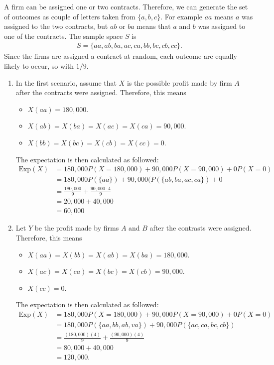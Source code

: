 \begin{problem}
A firm can be assigned one or two contracts. Therefore, we can generate the set of outcomes as couple of letters taken from $\{ a, b, c \}$. For example $aa$ means $a$ was assigned to the two contracts, but $ab$ or $ba$ means that $a$ and $b$ was assigned to one of the contracts. The sample space $S$ is
    \begin{align*}
    S = \{ aa, ab, ba, ac, ca, bb, bc, cb, cc \} .
    \end{align*}
Since the firms are assigned a contract at random, each outcome are equally likely to occur, so with $1/9$. 

\begin{enumerate}[label=\alph*)]
    \item In the first scenario, assume that $X$ is the possible profit made by firm $A$ after the contracts were assigned. Therefore, this means
        \begin{itemize}
            \item $X (aa) = 180,000$.
            \item $X(ab) = X (ba) = X(ac) = X (ca) = 90,000$.
            \item $X(bb) = X(bc) = X(cb) = X (cc) = 0$.
        \end{itemize}
    The expectation is then calculated as followed:
    \begin{align*}
        \mathrm{Exp} (X) &= 180,000 P (X = 180,000) + 90,000 P (X = 90,000) + 0 P (X = 0) \\ 
        &= 180,000 P (\{ aa \}) + 90,000 (P (\{ ab , ba, ac, ca \}) + 0 \\ 
        &= \frac{180,000}{9} + \frac{90,000 \cdot 4}{9} \\ 
        &=  20,000 + 40,000 \\
        &= 60,000
    \end{align*}
    \item Let $Y$ be the profit made by firms $A$ and $B$ after the contrasts were assigned. Therefore, this means
        \begin{itemize}
            \item $X (aa) = X(bb) = X(ab) = X (ba) = 180,000$.
            \item $X (ac) = X(ca) = X(bc) = X(cb) = 90,000$.
            \item $X (cc) = 0$.
        \end{itemize}
    The expectation is then calculated as followed:
        \begin{align*}
        \mathrm{Exp} (X) &= 180,000 P (X = 180,000) + 90,000 P (X = 90,000) + 0 P (X = 0) \\ 
        &= 180,000 P (\{ aa, bb, ab, va \}) + 90,000 P (\{ ac, ca, bc, cb \}) \\ 
        &= \frac{(180,000)(4)}{9} + \frac{(90,000)(4)}{9} \\ 
        &= 80,000 + 40,000 \\ 
        &= 120,000 . \tag*{$\triangle$}
        \end{align*} 
\end{enumerate}
\end{problem}

